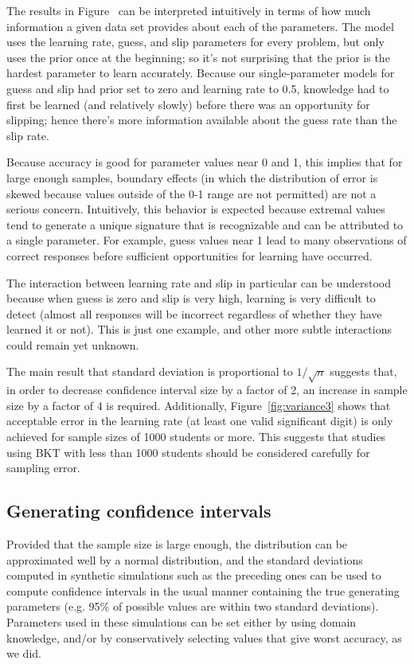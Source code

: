 \documentclass{edm_template}
\begin{document}
The results in Figure~\label{fig:variance1} can be interpreted intuitively in terms of how much information a given data set provides about each of the parameters. The model uses the learning rate, guess, and slip parameters for every problem, but only uses the prior once at the beginning; so it's not surprising that the prior is the hardest parameter to learn accurately. Because our single-parameter models for guess and slip had prior set to zero and learning rate to 0.5, knowledge had to first be learned (and relatively slowly) before there was an opportunity for slipping; hence there's more information available about the guess rate than the slip rate.

Because accuracy is good for parameter values near 0 and 1, this implies that for large enough samples, boundary effects (in which the distribution of error is skewed because values outside of the 0-1 range are not permitted) are not a serious concern. Intuitively, this behavior is expected because extremal values
tend to generate a unique signature that is recognizable and can be attributed to a single parameter.
For example, guess values near 1 lead to many observations of correct responses before sufficient opportunities for learning have occurred.

The interaction between learning rate and slip in particular can be understood because when guess is zero and slip is very high, learning is very difficult to detect (almost all responses will be incorrect regardless of whether they have learned it or not). This is just one example, and other more subtle interactions could remain yet unknown.

The main result that standard deviation is proportional to $1/\sqrt{n}$ suggests that, in order to decrease confidence interval size by a factor of 2, an increase in sample size by a factor of 4 is required. Additionally, Figure~\ref{fig:variance3} shows that acceptable error in the learning rate (at least one valid significant digit) is only achieved for sample sizes of 1000 students or more. This suggests that studies using BKT with less than 1000 students should be considered carefully for sampling error.

\subsection{Generating confidence intervals}

Provided that the sample size is large enough, the distribution can be approximated well by a normal
distribution, and the standard deviations computed in synthetic simulations such as the preceding ones
can be used to compute confidence intervals in the usual manner containing the true generating parameters (e.g. 95\% of possible values are within two standard deviations). Parameters used in these simulations can be set either by using domain knowledge, and/or by conservatively selecting values that give worst accuracy, as we did.
\end{document}
